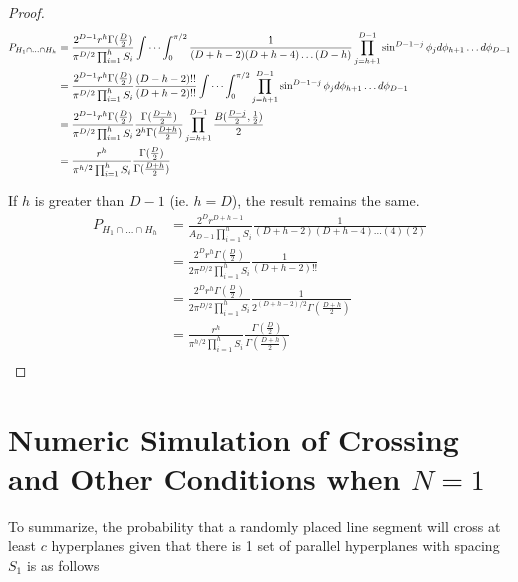 \documentclass{article}
\begin{document}
\begin{proof}
	\begin{align}
		P_{H_1\cap\hdots\cap H_h} &= \frac{2^{D-1}r^h\Gamma(\frac{D}{2})}{\pi^{D/2}\prod_{i=1}^h S_i} \idotsint_0^{\pi/2} \frac{1}{(D+h-2)(D+h-4)\hdots(D-h)} \prod_{j=h+1}^{D-1}\sin^{D-1-j}\phi_j d\phi_{h+1} \hdots d\phi_{D-1} \\
		&= \frac{2^{D-1}r^h\Gamma(\frac{D}{2})}{\pi^{D/2}\prod_{i=1}^h S_i} \frac{(D-h-2)!!}{(D+h-2)!!} \idotsint_0^{\pi/2} \prod_{j=h+1}^{D-1}\sin^{D-1-j}\phi_j d\phi_{h+1} \hdots d\phi_{D-1} \\
		&= \frac{2^{D-1}r^h\Gamma(\frac{D}{2})}{\pi^{D/2}\prod_{i=1}^h S_i} \frac{\Gamma(\frac{D-h}{2})}{2^h \Gamma(\frac{D+h}{2})} \prod_{j=h+1}^{D-1}\frac{B(\frac{D-j}{2}, \frac{1}{2})}{2} \\
		&= \frac{r^{h}}{\pi^{h/2}\prod_{i=1}^h S_i} \frac{\Gamma(\frac{D}{2})}{\Gamma(\frac{D+h}{2})} \\
	\end{align}

	If $h$ is greater than $D-1$ (ie. $h=D$), the result remains the same.
	\begin{align}
		P_{H_1\cap\hdots\cap H_h} &= \frac{2^Dr^{D+h-1}}{A_{D-1}\prod_{i=1}^h S_i}  \frac{1}{(D+h-2)(D+h-4)\hdots(4)(2)}  \\
		&= \frac{2^Dr^{h} \Gamma(\frac{D}{2})}{2 \pi^{D/2} \prod_{i=1}^h S_i} \frac{1}{(D+h-2)!!} \\
		&= \frac{2^Dr^{h} \Gamma(\frac{D}{2})}{2 \pi^{D/2} \prod_{i=1}^h S_i} \frac{1}{2^{(D+h-2)/2} \Gamma(\frac{D+h}{2})} \\
		&= \frac{r^{h}}{\pi^{h/2} \prod_{i=1}^h S_i} \frac{\Gamma(\frac{D}{2})}{\Gamma(\frac{D+h}{2})} \\
	\end{align}


\end{proof}

\section{Numeric Simulation of Crossing and Other Conditions when $N=1$} \label{s:n=1 numeric}
To summarize, the probability that a randomly placed line segment will cross at least $c$
hyperplanes given that there is 1 set of parallel hyperplanes with spacing $S_1$ is as follows
\end{document}
